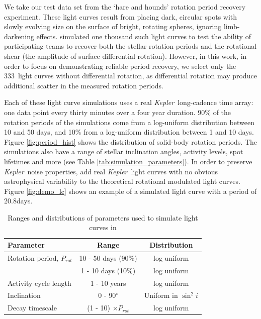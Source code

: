 \documentclass[useAMS, usenatbib, preprint, 12pt]{aastex}
\newcommand{\Kepler}{{\it Kepler}}
\newcommand{\kepler}{\Kepler}
\newcommand{\naigrain}{333}
\newcommand{\aigrainexampleperiod}{20.8}
\begin{document}
We take our test data set from the \citet{Aigrain2015} `hare and hounds'
rotation period recovery experiment.
These light curves result from placing dark, circular spots with slowly
evolving size on the surface of bright, rotating spheres, ignoring
limb-darkening effects.
\citet{Aigrain2015} simulated one thousand such light curves to test the
ability of participating teams to recover both the stellar rotation periods
and the rotational shear (the amplitude of surface differential rotation).
However, in this work, in order to focus on demonstrating reliable period recovery,
we select only the \naigrain\ light curves without differential rotation,
as differential rotation may produce additional scatter in the
measured rotation periods.

Each of these light curve simulations uses a real \Kepler\ long-cadence time array:
one data point every thirty minutes over a four year duration.
90\% of the rotation periods of the simulations come from a
log-uniform distribution between 10 and 50 days, and 10\% from a log-uniform
distribution between 1 and 10 days.
Figure \ref{fig:period_hist} shows the distribution of solid-body rotation periods.
The simulations also have a range of stellar inclination
angles, activity levels, spot lifetimes and more
(see Table \ref{tab:simulation_parameters}).
In order to preserve \kepler\ noise properties,
\citet{Aigrain2015} add real \kepler\ light curves with no obvious astrophysical
variability to the theoretical rotational modulated light curves.
Figure \ref{fig:demo_lc} shows an example of a simulated light curve with a
period of \aigrainexampleperiod days.

\begin{table}
\begin{center}
\caption{Ranges and distributions of parameters used to simulate light curves
in \citet{Aigrain2015}}
\begin{tabular}{lcc}
\hline\hline
    Parameter & Range & Distribution \\
    \hline
    Rotation period, $P_{rot}$ & 10 - 50 days (90\%) & log uniform \\
    & 1 - 10 days (10\%) & log uniform \\
    Activity cycle length & 1 - 10 years & log uniform \\
    Inclination & 0 - 90$^\circ$ & Uniform in $\sin^2i$ \\
    Decay timescale & (1 - 10) $\times P_{rot}$ & log uniform \\
\hline
\end{tabular}
\end{center}
\end{table}
\label{tab:simulation_parameters}
\end{document}
